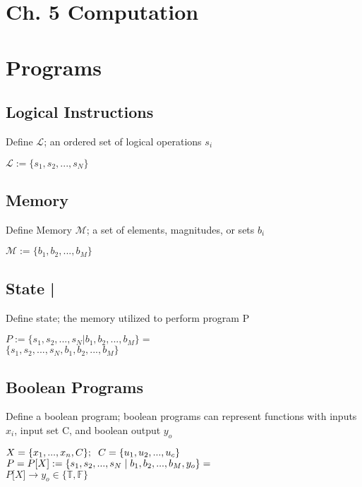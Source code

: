 \documentclass[11pt]{article}
\begin{document}
\section*{Ch. 5 Computation}





\section{Programs}
\subsection{Logical Instructions}
Define $\mathcal{L}$; an ordered set of logical operations $s_i$
\begin{center}
$
\mathcal{L} := \{ s_1,s_2,...,s_{N}\}
$
\end{center}





\subsection{Memory}
Define Memory $\mathcal{M}$; a set of elements, magnitudes, or sets $b_i$
\begin{center}
$\mathcal{M} := \{b_1,b_2,...,b_M\}$
\end{center}




\subsection{State |}
Define state; the memory utilized to perform program P
\begin{center}
$
P := \{ s_1, s_2,...,s_{N} | b_1, b_2,...,b_M\} =
$
\\ \vspace{2mm}
$
\{ s_1, s_2,...,s_{N}, b_1, b_2,...,b_M\}
$
\end{center}





\subsection{Boolean Programs}
Define a boolean program; boolean programs can represent functions with inputs $x_i$, input set C, and boolean output $y_o$
\begin{center}
$
X = \{x_1,...,x_n,C\}; \hspace{2mm} C = \{u_1,u_2,...,u_c\}
$
\\ \vspace{2mm}
$P = P\lbrack X \rbrack := \{ s_1,s_2,...,s_{N}\hspace{1mm}|\hspace{1mm} b_1, b_2,...,b_M,y_o\}=$
\\ \vspace{2mm}
$
P\lbrack X \rbrack \rightarrow y_o \in \{ \mathbb{T},\mathbb{F}\}
$
\end{center}
\end{document}
